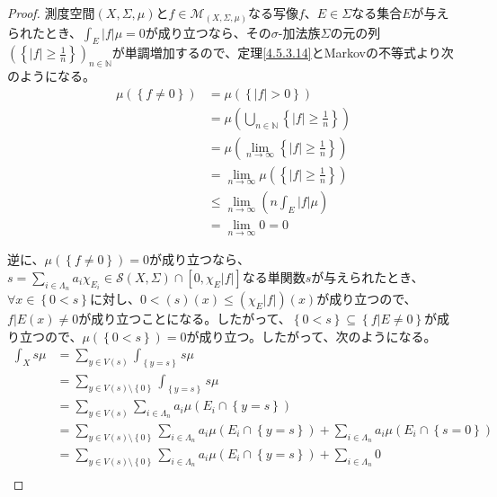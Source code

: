 \documentclass[dvipdfmx]{jsarticle}
\begin{document}
\begin{proof}
測度空間$(X,\varSigma,\mu)$と$f \in \mathcal{M}_{(X,\varSigma,\mu)}$なる写像$f$、$E \in \varSigma$なる集合$E$が与えられたとき、$\int_{E} {|f|\mu} = 0$が成り立つなら、その$\sigma$-加法族$\varSigma$の元の列$\left( \left\{ |f| \geq \frac{1}{n} \right\} \right)_{n \in \mathbb{N}}$が単調増加するので、定理\ref{4.5.3.14}とMarkovの不等式より次のようになる。
\begin{align*}
\mu\left( \left\{ f \neq 0 \right\} \right) &= \mu\left( \left\{ |f| > 0 \right\} \right)\\
&= \mu\left( \bigcup_{n \in \mathbb{N}} \left\{ |f| \geq \frac{1}{n} \right\} \right)\\
&= \mu\left( \lim_{n \rightarrow \infty}\left\{ |f| \geq \frac{1}{n} \right\} \right)\\
&= \lim_{n \rightarrow \infty}{\mu\left( \left\{ |f| \geq \frac{1}{n} \right\} \right)}\\
&\leq \lim_{n \rightarrow \infty}\left( n\int_{E} {|f|\mu} \right)\\
&= \lim_{n \rightarrow \infty}0 = 0
\end{align*}\par
逆に、$\mu\left( \left\{ f \neq 0 \right\} \right) = 0$が成り立つなら、$s = \sum_{i \in \varLambda_{n}} {a_{i}\chi_{E_{i}}}\in \mathcal{S}(X,\varSigma) \cap \left[ 0,\chi_{E}|f| \right]$なる単関数$s$が与えられたとき、$\forall x \in \left\{ 0 < s \right\}$に対し、$0 < (s)(x) \leq \left( \chi_{E}|f| \right)(x)$が成り立つので、$f|E(x) \neq 0$が成り立つことになる。したがって、$\left\{ 0 < s \right\} \subseteq \left\{ f|E \neq 0 \right\}$が成り立つので、$\mu\left( \left\{ 0 < s \right\} \right) = 0$が成り立つ。したがって、次のようになる。
\begin{align*}
\int_{X} {s\mu} &= \sum_{y \in V(s)} {\int_{\left\{ y = s \right\}} {s\mu}}\\
&= \sum_{y \in V(s) \setminus \left\{ 0 \right\}} {\int_{\left\{ y = s \right\}} {s\mu}}\\
&= \sum_{y \in V(s)} {\sum_{i \in \varLambda_{n}} {a_{i}\mu\left( E_{i} \cap \left\{ y = s \right\} \right)}}\\
&= \sum_{y \in V(s) \setminus \left\{ 0 \right\}} {\sum_{i \in \varLambda_{n}} {a_{i}\mu\left( E_{i} \cap \left\{ y = s \right\} \right)}} + \sum_{i \in \varLambda_{n}} {a_{i}\mu\left( E_{i} \cap \left\{ s = 0 \right\} \right)}\\
&= \sum_{y \in V(s) \setminus \left\{ 0 \right\}} {\sum_{i \in \varLambda_{n}} {a_{i}\mu\left( E_{i} \cap \left\{ y = s \right\} \right)}} + \sum_{i \in \varLambda_{n}} 0\\

\end{align*}
\end{proof}
\end{document}
